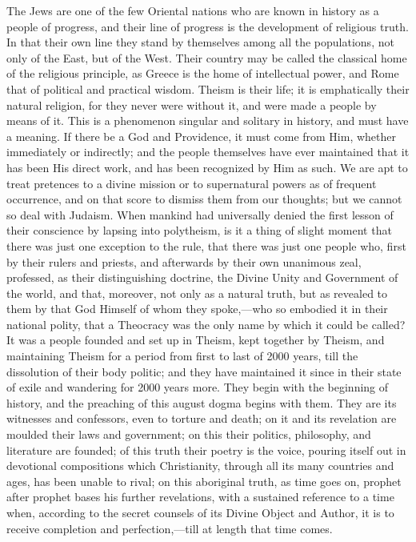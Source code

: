 The Jews are one of the few Oriental nations who are known in
history as a people of progress, and their line of progress is the
development of religious truth. In that their own line they stand by
themselves among all the populations, not only of the East, but of the
West. Their country may be called the classical home of the religious
principle, as Greece is the home of intellectual power, and Rome that
of political and practical wisdom. Theism is their life; it is
emphatically their natural religion, for they never were without it,
and were made a people by means of it. This is a phenomenon singular
and solitary in history, and must have a meaning. If there be a God
and Providence, it must come from Him, whether immediately or
indirectly; and the people themselves have ever maintained that it has
been His direct work, and has been recognized by Him as such. We are
apt to treat pretences to a divine mission or to supernatural powers
as of frequent occurrence, and on that score to dismiss them from our
thoughts; but we cannot so deal with Judaism. When mankind had
universally denied the first lesson of their conscience by lapsing
into polytheism, is it a thing of slight moment that there was just
one exception to the rule, that there was just one people who, first
by their rulers and priests, and afterwards by their own unanimous
zeal, professed, as their distinguishing doctrine, the Divine
Unity and Government of the world, and that, moreover, not only as a
natural truth, but as revealed to them by that God Himself of whom
they spoke,—who so embodied it in their national polity, that a
Theocracy was the only name by which it could be called? It was a
people founded and set up in Theism, kept together by Theism, and
maintaining Theism for a period from first to last of 2000 years, till
the dissolution of their body politic; and they have maintained it
since in their state of exile and wandering for 2000 years more. They
begin with the beginning of history, and the preaching of this august
dogma begins with them. They are its witnesses and confessors, even to
torture and death; on it and its revelation are moulded their laws and
government; on this their politics, philosophy, and literature are
founded; of this truth their poetry is the voice, pouring itself out
in devotional compositions which Christianity, through all its many
countries and ages, has been unable to rival; on this aboriginal
truth, as time goes on, prophet after prophet bases his further
revelations, with a sustained reference to a time when, according to
the secret counsels of its Divine Object and Author, it is to receive
completion and perfection,—till at length that time comes.

